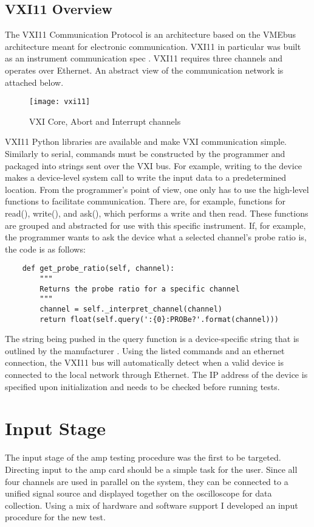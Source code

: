 \subsection{VXI11 Overview}
The VXI11 Communication Protocol is an architecture based on the VMEbus architecture meant for electronic communication. VXI11 in particular was built as an instrument communication spec \cite{vxi}. VXI11 requires three channels and operates over Ethernet. An abstract view of the communication network is attached below.
\begin{figure}
	\centering
	\texttt{[image: vxi11]}
	\caption{VXI Core, Abort and Interrupt channels \cite{vxi}}
\end{figure}
VXI11 Python libraries are available and make VXI communication simple. Similarly to serial, commands must be constructed by the programmer and packaged into strings sent over the VXI bus. For example, writing to the device makes a device-level system call to write the input data to a predetermined location. From the programmer's point of view, one only has to use the high-level functions to facilitate communication. There are, for example, functions for read(), write(), and ask(), which performs a write and then read. These functions are grouped and abstracted for use with this specific instrument. If, for example, the programmer wants to ask the device what a selected channel's probe ratio is, the code is as follows:
\begin{lstlisting}
	def get_probe_ratio(self, channel):
		"""
		Returns the probe ratio for a specific channel
		"""
		channel = self._interpret_channel(channel)
		return float(self.query(':{0}:PROBe?'.format(channel)))
\end{lstlisting}
The string being pushed in the query function is a device-specific string that is outlined by the manufacturer \cite{rigol}. Using the listed commands and an ethernet connection, the VXI11 bus will automatically detect when a valid device is connected to the local network through Ethernet. The IP address of the device is specified upon initialization and needs to be checked before running tests.

\section{Input Stage}
The input stage of the amp testing procedure was the first to be targeted. Directing input to the amp card should be a simple task for the user. Since all four channels are used in parallel on the system, they can be connected to a unified signal source and displayed together on the oscilloscope for data collection. Using a mix of hardware and software support I developed an input procedure for the new test.
